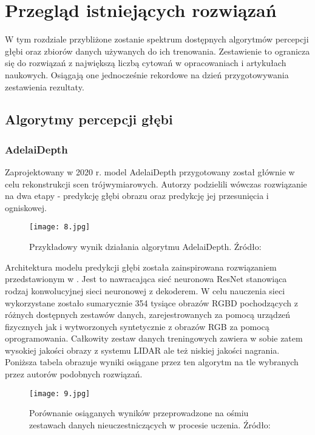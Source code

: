 \chapter{Przegląd istniejących rozwiązań}\label{chap:3_przegląd_istniejących_rozwiązań}

W tym rozdziale przybliżone zostanie spektrum dostępnych algorytmów percepcji głębi oraz zbiorów danych używanych do ich trenowania. Zestawienie to ogranicza się do rozwiązań z największą liczbą cytowań w opracowaniach i artykułach naukowych. Osiągają one jednocześnie rekordowe na dzień przygotowywania zestawienia rezultaty.

\section{Algorytmy percepcji głębi}
\subsection{AdelaiDepth}
Zaprojektowany w 2020 r. model AdelaiDepth \cite{yin2020} przygotowany został głównie w celu rekonstrukcji scen trójwymiarowych. Autorzy podzielili wówczas rozwiązanie na dwa etapy - predykcję głębi obrazu oraz predykcję jej przesunięcia i ogniskowej.
\begin{figure}[H]
    \centering
    \texttt{[image: 8.jpg]}
    \caption{Przykładowy wynik działania algorytmu AdelaiDepth. Źródło: \cite{yin2020}}
    \label{fig:adelaidepth}
\end{figure}
Architektura modelu predykcji głębi została zainspirowana rozwiązaniem przedstawionym w \cite{xian2020}. Jest to nawracająca sieć neuronowa ResNet \cite{he2015} stanowiąca rodzaj konwolucyjnej sieci neuronowej z dekoderem. W celu nauczenia sieci wykorzystane zostało sumarycznie 354 tysiące obrazów RGBD pochodzących z różnych dostępnych zestawów danych, zarejestrowanych za pomocą urządzeń fizycznych jak i wytworzonych syntetycznie z obrazów RGB za pomocą oprogramowania. Całkowity zestaw danych treningowych zawiera w sobie zatem  wysokiej jakości obrazy z systemu LIDAR ale też niskiej jakości nagrania. Poniższa tabela obrazuje wyniki osiągane przez ten algorytm na tle wybranych przez autorów podobnych rozwiązań.
\begin{figure}[H]
    \centering
    \texttt{[image: 9.jpg]}
    \caption{Porównanie osiąganych wyników przeprowadzone na ośmiu zestawach danych nieuczestniczących w procesie uczenia. Źródło: \cite{yin2020}}
    \label{fig:adelaidepth-results}
\end{figure}

